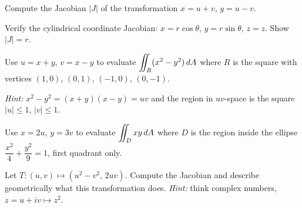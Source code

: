 \documentclass[11pt]{article}
\begin{document}
\begin{practice}

\prob Compute the Jacobian $|J|$ of the transformation $x = u+v$, $y = u-v$.


\vspace{3cm}

\prob Verify the cylindrical coordinate Jacobian: $x = r\cos\theta$, $y = r\sin\theta$, $z = z$. Show $|J| = r$.


\vspace{4cm}

\prob Use $u = x+y$, $v = x-y$ to evaluate $\displaystyle\iint_R (x^2-y^2)\,dA$ where $R$ is the square with vertices $(1,0)$, $(0,1)$, $(-1,0)$, $(0,-1)$.

\textit{Hint:} $x^2-y^2 = (x+y)(x-y) = uv$ and the region in $uv$-space is the square $|u|\le 1$, $|v|\le 1$.


\vspace{5cm}

\prob Use $x = 2u$, $y = 3v$ to evaluate $\displaystyle\iint_D xy\,dA$ where $D$ is the region inside the ellipse $\dfrac{x^2}{4}+\dfrac{y^2}{9} = 1$, first quadrant only.


\vspace{5cm}

\prob Let $T\colon (u,v) \mapsto (u^2-v^2,\, 2uv)$. Compute the Jacobian and describe geometrically what this transformation does. \textit{Hint:} think complex numbers, $z = u+iv \mapsto z^2$.


\vspace{4cm}

\end{practice}
\end{document}
